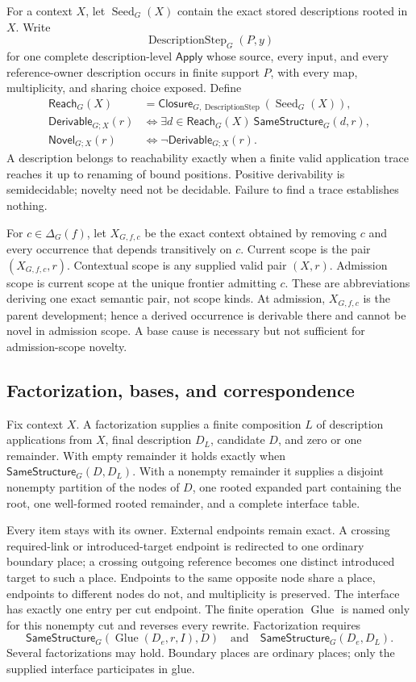 \documentclass[11pt,twoside]{article}
\newcommand{\Apply}{\mathsf{Apply}}
\newcommand{\Closure}{\mathsf{Closure}}
\newcommand{\Reach}{\mathsf{Reach}}
\newcommand{\SameStructure}{\mathsf{SameStructure}}
\newcommand{\Derivable}{\mathsf{Derivable}}
\newcommand{\Novel}{\mathsf{Novel}}
\begin{document}
For a context \(X\), let \(\operatorname{Seed}_{G}(X)\) contain the exact stored
descriptions rooted in \(X\).  Write
\[
  \operatorname{DescriptionStep}_G(P,y)
\]
for one complete description-level \(\Apply\) whose source, every input, and every
reference-owner description occurs in finite support \(P\), with every map,
multiplicity, and sharing choice exposed.
Define
\[
\begin{aligned}
  \Reach_G(X)
    &=\Closure_{G,\operatorname{DescriptionStep}}
         (\operatorname{Seed}_{G}(X)),\\
  \Derivable_{G;X}(r)
    &\Longleftrightarrow
      \exists d\in\Reach_G(X)\ \SameStructure_G(d,r),\\
  \Novel_{G;X}(r)
    &\Longleftrightarrow \neg\Derivable_{G;X}(r).
\end{aligned}
\]
A description belongs to reachability exactly when a finite valid application
trace reaches it up to renaming of bound positions.  Positive derivability is
semidecidable; novelty need not be decidable.  Failure to find a trace establishes
nothing.

For \(c\in\Delta_G(f)\), let \(X_{G,f,c}\) be the exact context obtained by removing
\(c\) and every occurrence that depends transitively on \(c\).  Current scope is
the pair \((X_{G,f,c},r)\).  Contextual scope is any supplied valid pair \((X,r)\).
Admission scope is current scope at the unique frontier admitting \(c\).  These are
abbreviations deriving one exact semantic pair, not scope kinds.  At admission,
\(X_{G,f,c}\) is the parent development; hence a derived occurrence is derivable
there and cannot be novel in admission scope.  A base cause is necessary but not
sufficient for admission-scope novelty.

\subsection{Factorization, bases, and correspondence}

Fix context \(X\).  A factorization supplies a finite composition \(L\) of
description applications from \(X\), final description \(D_L\), candidate \(D\),
and zero or one remainder.  With empty remainder it holds exactly when
\(\SameStructure_G(D,D_L)\).  With a nonempty remainder it supplies a disjoint
nonempty partition of the nodes of \(D\), one rooted expanded part containing the
root, one well-formed rooted remainder, and a complete interface table.

Every item stays with its owner.  External endpoints remain exact.  A crossing
required-link or introduced-target endpoint is redirected to one ordinary boundary
place; a crossing outgoing reference becomes one distinct introduced target to
such a place.  Endpoints to the same opposite node share a place, endpoints to
different nodes do not, and multiplicity is preserved.  The interface has exactly
one entry per cut endpoint.  The finite operation
\(\operatorname{Glue}\) is named only for this nonempty cut and reverses every
rewrite.  Factorization requires
\[
  \SameStructure_G(\operatorname{Glue}(D_e,r,I),D)
  \quad\text{and}\quad
  \SameStructure_G(D_e,D_L).
\]
Several factorizations may hold.  Boundary places are ordinary places; only the
supplied interface participates in glue.
\end{document}
